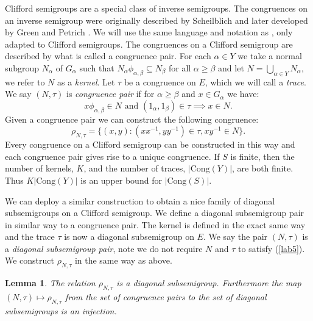 \documentclass[a4paper, 12pt,reqno]{amsart}
\theoremstyle{plain}
\newtheorem{lemma}[thm]{Lemma}
\theoremstyle{definition}
\theoremstyle{remark}
\newcommand{\Cong}{\text{Cong}}
\begin{document}
Clifford semigroups are a special class of inverse semigroups. 
The congruences on an inverse semigroup were originally described by Scheilblich \cite{Scheiblich_1974} and later developed by Green \cite{MR390093} and Petrich \cite{PETRICH1978231}.
We will use the same language and notation as \cite[Section 5.3]{Ho95}, only adapted to Clifford semigroups.
The congruences on a Clifford semigroup are described by what is called a congruence pair.
For each $\alpha \in Y$ we take a normal subgroup $N_\alpha$ of $G_\alpha$ such that $N_\alpha \phi_{\alpha ,\beta} \subseteq N_\beta$ for all $\alpha \geq \beta$ and let $N = \bigcup_{\alpha \in Y}N_\alpha$, we refer to $N$ as a \textit{kernel}.
Let $\tau$ be a congruence on $E$, which we will call a \textit{trace}.
We say $(N,\tau) $ is \textit{congruence pair} if for $\alpha \geq \beta$ and $x \in G_\alpha$ we have:
\begin{equation}
    \label{lab5}
    x \phi_{\alpha , \beta} \in N \text{ and } (1_\alpha , 1_\beta) \in \tau \implies x \in N.
\end{equation}
Given a congruence pair we can construct the following congruence:
\begin{equation*}
    \rho_{N,\tau } = \{(x,y) : (xx^{-1},yy^{-1}) \in \tau, xy^{-1} \in N \}.
\end{equation*}
Every congruence on a Clifford semigroup can be constructed in this way and each congruence pair gives rise to a unique congruence.
If $S$ is finite, then the number of kernels, $K$, and the number of traces, $|\Cong(Y)|$, are both finite.
Thus $K |\Cong(Y)|$ is an upper bound for $|\Cong(S)|$.

We can deploy a similar construction to obtain a nice family of diagonal subsemigroups on a Clifford semigroup.
We define a diagonal subsemigroup pair in similar way to a congruence pair.
The kernel is defined in the exact same way and the trace $\tau$ is now a diagonal subsemigroup on $E$.
We say the pair $(N ,\tau)$ is a \textit{diagonal subsemigroup pair}, note we do not require $N$ and $\tau$ to satisfy (\ref{lab5}).
We construct $\rho_{N,\tau}$ in the same way as above.

\begin{lemma}
    \label{clifford diagonal subsemigroup family}
    The relation $\rho_{N,\tau}$ is a diagonal subsemigroup.
    Furthermore the map $(N,\tau) \mapsto \rho_{N,\tau}$ from the set of congruence pairs to the set of diagonal subsemigroups is an injection.
\end{lemma}
\end{document}
